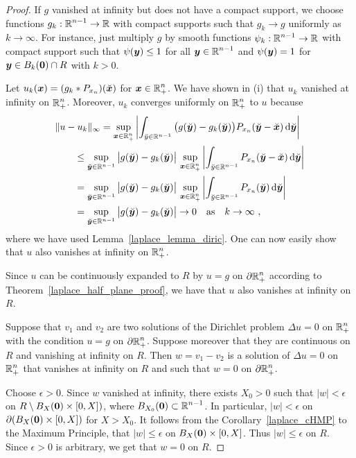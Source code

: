 \begin{proof}
 If $g$ vanished at infinity but does not have a compact
support, we choose functions $\displaystyle g_k:\mathbb{R}^{n-1}\to \mathbb{R}$ with
compact supports such that $g_k \to g$ uniformly as $k \to \infty$.
For instance, just multiply $g$ by smooth functions
$\displaystyle \psi_k:\mathbb{R}^{n-1}\to \mathbb{R}$ with compact support such that
$\psi({\bm{y}}) \leq 1$ for all $\displaystyle {\bm{y}} \in \mathbb{R}^{n-1}$ and
$\psi({\bm{y}}) =1$ for ${\bm{y}} \in B_k({\bm{0}}) \cap R$ with $k>0$.

Let $u_k({\bm{x}}) = (g_k \ast P_{x_n})(\breve{{\bm{x}}})$ for
$\displaystyle {\bm{x}} \in \mathbb{R}^n_+$.  We have shown in (i) that $u_k$
vanished at infinity on $\displaystyle \mathbb{R}^n_+$.  Moreover, $u_k$
converges uniformly on $\displaystyle \mathbb{R}^n_+$ to $u$ because
\begin{align*}
&\| u - u_k \|_\infty = \sup_{{\bm{x}}\in\mathbb{R}^n_+} 
\left| \int_{\breve{y} \in \mathbb{R}^{n-1}}
\big(g(\breve{{\bm{y}}}) - g_k(\breve{{\bm{y}}}) \big)
P_{x_n}(\breve{{\bm{y}}}-\breve{{\bm{x}}}) \,\mathrm{d}{\breve{{\bm{y}}}} \right| \\
&\qquad \leq \sup_{\breve{{\bm{y}}}\in \mathbb{R}^{n-1}}
\big|g(\breve{{\bm{y}}}) - g_k(\breve{{\bm{y}}}) \big|
\, \sup_{{\bm{x}}\in\mathbb{R}^n_+} \left| \int_{\breve{y} \in \mathbb{R}^{n-1}}
P_{x_n}(\breve{{\bm{y}}}-\breve{{\bm{x}}}) \,\mathrm{d}{\breve{{\bm{y}}}}\right| \\
&\qquad = \sup_{\breve{{\bm{y}}}\in \mathbb{R}^{n-1}}
\big|g(\breve{{\bm{y}}}) - g_k(\breve{{\bm{y}}}) \big|
\, \sup_{{\bm{x}}\in\mathbb{R}^n_+} \left| \int_{\breve{y} \in \mathbb{R}^{n-1}}
P_{x_n}(\breve{{\bm{y}}}) \,\mathrm{d}{\breve{{\bm{y}}}}\right| \\
&\qquad = \sup_{\breve{{\bm{y}}}\in \mathbb{R}^{n-1}}
\big|g(\breve{{\bm{y}}}) - g_k(\breve{{\bm{y}}}) \big| \to 0 \quad
\text{as} \quad k \to \infty \ ,
\end{align*}
where we have used Lemma~\ref{laplace_lemma_diric}.
One can now easily show that $u$ also vanishes at infinity on
$\displaystyle \mathbb{R}^n_+$.

Since $u$ can be continuously expanded to
$R$ by $u=g$ on $\displaystyle \partial \mathbb{R}^n_+$
according to Theorem~\ref{laplace_half_plane_proof}, we
have that $u$ also vanishes at infinity on $R$.

  Suppose that $v_1$ and $v_2$ are two solutions of the
Dirichlet problem $\Delta u=0$ on $\displaystyle \mathbb{R}^n_+$ with the
condition $u=g$ on $\displaystyle \partial \mathbb{R}^n_+$.  Suppose moreover
that they are continuous on $R$ and vanishing at infinity on $R$.
Then $w = v_1-v_2$ is a solution of $\Delta u=0$ on
$\displaystyle \mathbb{R}^n_+$ that vanishes at infinity on
$R$ and such that $w=0$ on $\displaystyle \partial \mathbb{R}^n_+$.

Choose $\epsilon >0$.  Since $w$ vanished at infinity, there exists
$X_0 >0$ such that $|w| < \epsilon$ on
$R \setminus B_X({\bm{0}}) \times [0,X])$, where
$\displaystyle B_{X_0}({\bm{0}}) \subset \mathbb{R}^{n-1}$. 
In particular, $|w| < \epsilon$ on $\partial (B_X({\bm{0}}) \times [0,X])$
for $X > X_0$.  It follows from the Corollary~\ref{laplace_cHMP} to
the Maximum Principle, that
$|w| \leq \epsilon$ on $B_X({\bm{0}}) \times [0,X]$.
Thus $|w| \leq \epsilon$ on $R$.
Since $\epsilon > 0$ is arbitrary, we get that $w=0$ on $R$.
\end{proof}

